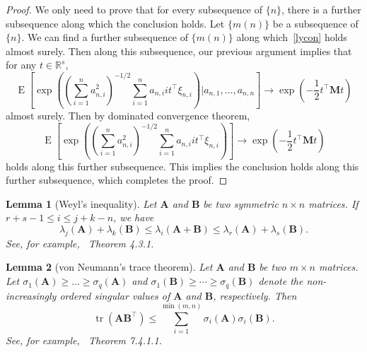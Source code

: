 \documentclass[12pt]{article} %
\DeclareMathOperator{\mytr}{tr}
\DeclareMathOperator{\myE}{E}
\newcommand{\bM}{\mathbf{M}}
\newcommand{\bA}{\mathbf{A}}
\newcommand{\bB}{\mathbf{B}}
\newtheorem{lemma}{Lemma}
\theoremstyle{definition}
\begin{document}
\begin{appendices}
\begin{proof}
    We only need to prove that for every subsequence of $\{n\}$, there is a further subsequence along which the conclusion holds.
    Let $\{m(n)\}$  be a subsequence of $\{n\}$.
    We can find a further subsequence of $\{m(n)\}$ along which~\eqref{lycon} holds almost surely.
    Then along this subsequence, our previous argument implies that
    for any $t\in\mathbb{R}^s$,
    \begin{equation*}
        \myE
       \left[ 
        \exp\left(
    (\sum_{i=1}^n a_{n,i}^2)^{-1/2}\sum_{i=1}^n a_{n,i}it^\top \xi_{n,i} 
    \right)
    \bigg| a_{n,1},\ldots, a_{n,n}
\right]
    \to
    \exp\left(-\frac{1}{2} t^\top \bM t\right)
    \end{equation*}
    almost surely.
    Then by dominated convergence theorem,
    \begin{equation*}
        \myE
       \left[ 
        \exp\left(
    (\sum_{i=1}^n a_{n,i}^2)^{-1/2}\sum_{i=1}^n a_{n,i}it^\top \xi_{n,i} 
    \right)
\right]
    \to
    \exp\left(-\frac{1}{2} t^\top \bM t\right)
    \end{equation*}
    holds along this further subsequence. This implies the conclusion holds along this further subsequence, which completes the proof.




 
\end{proof}

    \begin{lemma}[Weyl's inequality]
        Let $\bA$ and $\bB$ be two symmetric $n\times n$ matrices. If $r+s-1\leq i \leq j+k-n$, we have
        $$
        \lambda_j(\bA) +\lambda_k(\bB)\leq \lambda_i (\bA+\bB) \leq
        \lambda_r(\bA)+\lambda_s(\bB).
        $$
        See, for example,~\citet{Horn1985Matrix} Theorem 4.3.1.
\end{lemma}
\begin{lemma}[von Neumann's trace theorem]
    Let $\bA$ and $\bB$ be two $m\times n$ matrices. Let $\sigma_1(\bA)\geq \ldots \geq \sigma_q (\bA)$ and $\sigma_1(\bB)\geq \cdots \geq \sigma_q (\bB)$ denote the non-increasingly ordered singular values of $\bA$ and $\bB$, respectively. Then
    \begin{equation*}
        \mytr(\bA \bB^\top)\leq \sum_{i=1}^{\min(m,n)}\sigma_i(\bA)\sigma_i(\bB).
    \end{equation*}
    See, for example,~\citet{Horn1985Matrix} Theorem 7.4.1.1.
\end{lemma}


\end{appendices}
\end{document}
